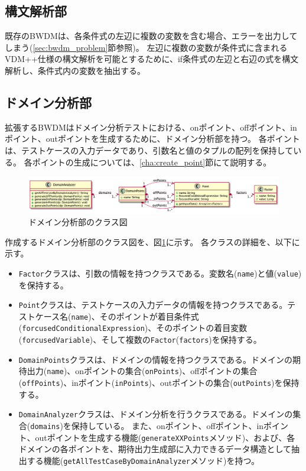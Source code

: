 \documentclass[uplatex, report, a4j, 10pt]{jsbook}
\newcommand\ttt[1]{\texttt{#1}}
\begin{document}
\subsection{構文解析部}
既存のBWDMは、各条件式の左辺に複数の変数を含む場合、エラーを出力してしまう(\ref{sec:bwdm_problem}節参照)。
左辺に複数の変数が条件式に含まれるVDM++仕様の構文解析を可能とするために、if条件式の左辺と右辺の式を構文解析し、条件式内の変数を抽出する。

\subsection{ドメイン分析部}\label{cha:DomainAnalyzer}
拡張するBWDMはドメイン分析テストにおける、onポイント、offポイント、inポイント、outポイントを生成するために、ドメイン分析部を持つ。
各ポイントは、テストケースの入力データであり、引数名と値のタプルの配列を保持している。
各ポイントの生成については、\ref{cha:create_point}節にて説明する。

\begin{figure}[t]
  \begin{center}
    \includegraphics[keepaspectratio, width=160mm]{figs/DomainAnalyzer.png}
    \caption{ドメイン分析部のクラス図}
    \label{fig:class_DomainAnalyzer}
  \end{center}
\end{figure}

作成するドメイン分析部のクラス図を、図\ref{fig:class_DomainAnalyzer}に示す。
各クラスの詳細を、以下に示す。

\newcommand{\forcusedConditionalExpression}{\ttt{forcusedConditionalExpression}}

\begin{itemize}
  \item \ttt{Factor}クラスは、引数の情報を持つクラスである。変数名(\ttt{name})と値(\ttt{value})を保持する。
  \item \ttt{Point}クラスは、テストケースの入力データの情報を持つクラスである。テストケース名(\ttt{name})、そのポイントが着目条件式(\forcusedConditionalExpression{})、そのポイントの着目変数(\ttt{forcusedVariable})、そして複数の\ttt{Factor}(\ttt{factors})を保持する。
  \item \ttt{DomainPoints}クラスは、ドメインの情報を持つクラスである。ドメインの期待出力(\ttt{name})、onポイントの集合(\ttt{onPoints})、offポイントの集合(\ttt{offPoints})、inポイント(\ttt{inPoints})、outポイントの集合(\ttt{outPoints})を保持する。
  \item \ttt{DomainAnalyzer}クラスは、ドメイン分析を行うクラスである。ドメインの集合(\ttt{domains})を保持している。
        また、onポイント、offポイント、inポイント、outポイントを生成する機能(\ttt{generateXXPoints}メソッド)、および、各ドメインの各ポイントを、期待出力生成部に入力できるデータ構造として抽出する機能(\ttt{getAllTestCaseByDomainAnalyzer}メソッド)を持つ。

\end{itemize}
\end{document}

